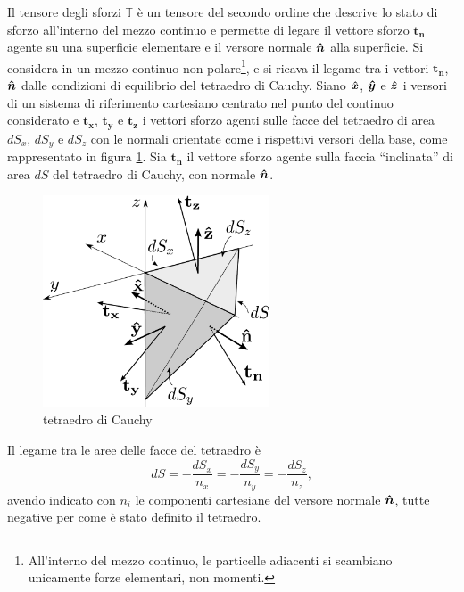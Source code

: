 

Il tensore degli sforzi $\mathbb{T}$ è un tensore del secondo ordine che descrive lo stato di sforzo all'interno del mezzo continuo e permette di legare il vettore sforzo $\bm{t_n}$ agente su una superficie elementare e il versore normale $\bm{\hat{n}}$ alla superficie.
Si considera in un mezzo continuo non polare\footnote{
 All'interno del mezzo continuo, le particelle adiacenti si scambiano unicamente forze elementari, non momenti.
}, e si ricava il legame tra i vettori $\bm{t_n}$, $\bm{\hat{n}}$ dalle condizioni di equilibrio del tetraedro di Cauchy. Siano $\bm{\hat{x}}$, $\bm{\hat{y}}$ e $\bm{\hat{z}}$ i versori di un sistema di riferimento cartesiano centrato nel punto del continuo considerato e $\bm{t_x}$, $\bm{t_y}$ e $\bm{t_z}$ i vettori sforzo agenti sulle facce del tetraedro di area $dS_x$, $dS_y$ e $dS_z$ con le normali orientate come i rispettivi versori della base, come rappresentato in figura \ref{fig:tetraedroCauchy}. Sia $\bm{t_n}$ il vettore sforzo agente sulla faccia ``inclinata'' di area $dS$ del tetraedro di Cauchy, con normale $\bm{\hat{n}}$.

\begin{figure}[h!]
\centering
 \includegraphics[width=0.60\textwidth]{./fig/cauchy}
\caption{tetraedro di Cauchy}\label{fig:tetraedroCauchy}
\end{figure}

Il legame tra le aree delle facce del tetraedro è
\begin{equation}\label{eqn:surfaces}
 dS = - \dfrac{dS_x}{n_x} = - \dfrac{dS_y}{n_y} = - \dfrac{dS_z}{n_z} ,
\end{equation}
avendo indicato con $n_i$ le componenti cartesiane del versore normale $\bm{\hat{n}}$, tutte negative per come è stato definito il tetraedro.

